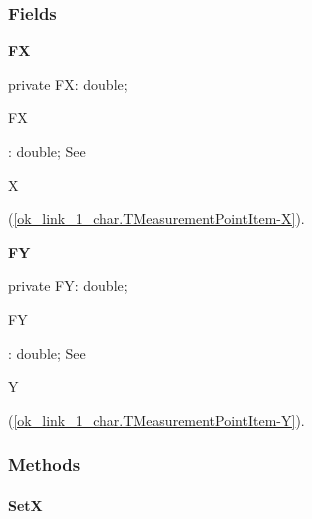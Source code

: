 \documentclass{report}
\newif\ifpdf
\begin{document}
\subsubsection*{\large{\textbf{Fields}}\normalsize\hspace{1ex}\hfill}
\begin{list}{}{
\setlength{\itemindent}{0cm}
\setlength{\listparindent}{0cm}
\setlength{\leftmargin}{\evensidemargin}
\addtolength{\leftmargin}{\tmplength}
\settowidth{\labelsep}{X}
\addtolength{\leftmargin}{\labelsep}
\setlength{\labelwidth}{\tmplength}
}
\label{ok_link_1_char.TMeasurementPointItem-FX}
\item[\textbf{FX}\hfill]
\ifpdf
\begin{flushleft}
\fi
\begin{ttfamily}
private FX: double;\end{ttfamily}

\ifpdf
\end{flushleft}
\fi


\par \begin{ttfamily}FX\end{ttfamily}: double; See \begin{ttfamily}X\end{ttfamily}(\ref{ok_link_1_char.TMeasurementPointItem-X}).\label{ok_link_1_char.TMeasurementPointItem-FY}
\item[\textbf{FY}\hfill]
\ifpdf
\begin{flushleft}
\fi
\begin{ttfamily}
private FY: double;\end{ttfamily}

\ifpdf
\end{flushleft}
\fi


\par \begin{ttfamily}FY\end{ttfamily}: double; See \begin{ttfamily}Y\end{ttfamily}(\ref{ok_link_1_char.TMeasurementPointItem-Y}).\end{list}
\subsubsection*{\large{\textbf{Methods}}\normalsize\hspace{1ex}\hfill}
\paragraph*{SetX}\hspace*{\fill}
\end{document}

